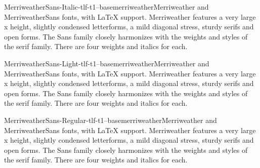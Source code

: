 \documentclass{ddltxtyp}
\begin{document}
\begin{package}{MerriweatherSans-Italic-tlf-t1--base}{merriweather}{Merriweather and MerriweatherSans fonts, with {\LaTeX} support.}
Merriweather features a very large x height, slightly condensed
letterforms, a mild diagonal stress, sturdy serifs and open
forms. The Sans family closely harmonizes with the weights and
styles of the serif family. There are four weights and italics
for each.
\end{package}
\begin{package}{MerriweatherSans-Light-tlf-t1--base}{merriweather}{Merriweather and MerriweatherSans fonts, with {\LaTeX} support.}
Merriweather features a very large x height, slightly condensed
letterforms, a mild diagonal stress, sturdy serifs and open
forms. The Sans family closely harmonizes with the weights and
styles of the serif family. There are four weights and italics
for each.
\end{package}
\begin{package}{MerriweatherSans-Regular-tlf-t1--base}{merriweather}{Merriweather and MerriweatherSans fonts, with {\LaTeX} support.}
Merriweather features a very large x height, slightly condensed
letterforms, a mild diagonal stress, sturdy serifs and open
forms. The Sans family closely harmonizes with the weights and
styles of the serif family. There are four weights and italics
for each.
\end{package}
\end{document}
